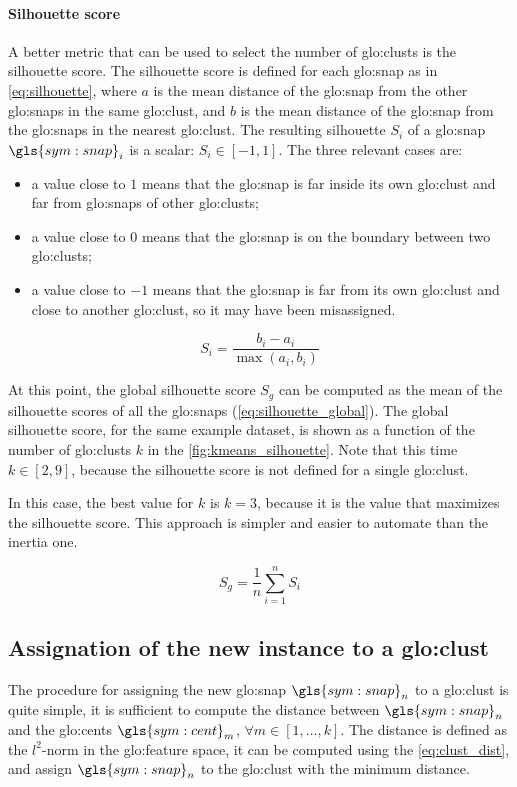 \paragraph*{Silhouette score}
A better metric that can be used to select the number of \gls{glo:clust}s is the silhouette score.
The silhouette score is defined for each {\gls{glo:snap}} as in \autoref{eq:silhouette}, where $a$ is the mean distance of the {\gls{glo:snap}} from the other {\gls{glo:snap}}s in the same \gls{glo:clust}, and $b$ is the mean distance of the {\gls{glo:snap}} from the {\gls{glo:snap}}s in the nearest \gls{glo:clust}. The resulting silhouette $S_i$ of a {\gls{glo:snap}} $\gls{sym:snap}_i$ is a scalar: $S_i \in [-1,1]$.
The three relevant cases are:
\begin{itemize}
  \item a value close to $1$ means that the {\gls{glo:snap}} is far inside its own \gls{glo:clust} and far from {\gls{glo:snap}}s of other \gls{glo:clust}s;
  \item a value close to $0$ means that the {\gls{glo:snap}} is on the boundary between two \gls{glo:clust}s;
  \item a value close to $-1$ means that the {\gls{glo:snap}} is far from its own \gls{glo:clust} and close to another \gls{glo:clust}, so it may have been misassigned.
\end{itemize}

\begin{equation}
  \label{eq:silhouette}
  S_i = \frac{b_i - a_i}{\max{(a_i,b_i)}}
\end{equation}

At this point, the global silhouette score $S_g$ can be computed as the mean of the silhouette scores of all the {\gls{glo:snap}}s (\autoref{eq:silhouette_global}). The global silhouette score, for the same example dataset, is shown as a function of the number of \gls{glo:clust}s $k$ in the \autoref{fig:kmeans_silhouette}. Note that this time $k \in [2,9]$, because the silhouette score is not defined for a single \gls{glo:clust}.

In this case, the best value for $k$ is $k=3$, because it is the value that maximizes the silhouette score. This approach is simpler and easier to automate than the inertia one. 

\begin{equation}
  \label{eq:silhouette_global}
  S_g = \frac{1}{n}\sum_{i=1}^{n} S_i
\end{equation}

\subsection{Assignation of the new instance to a \gls{glo:clust}}
The procedure for assigning the new {\gls{glo:snap}} $\gls{sym:snap}_n$ to a \gls{glo:clust} is quite simple, it is sufficient to compute the distance between $\gls{sym:snap}_n$ and the {\gls{glo:cent}}s $\gls{sym:cent}_m$, $\forall m \in  [1, \dots , k]$. The distance is defined as the $l^2$-norm in the \gls{glo:feature} space, it can be computed using the \autoref{eq:clust_dist}, and assign $\gls{sym:snap}_n$ to the \gls{glo:clust} with the minimum distance.

